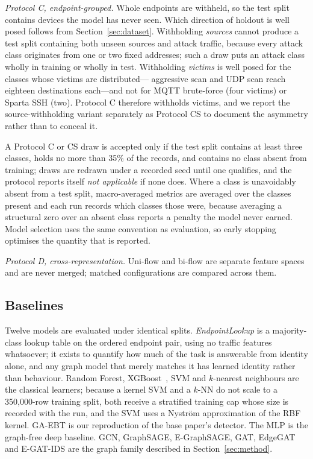 \emph{Protocol C, endpoint-grouped.} Whole endpoints are withheld, so the test
split contains devices the model has never seen. Which direction of holdout is
well posed follows from Section~\ref{sec:dataset}. Withholding \emph{sources}
cannot produce a test split containing both unseen sources and attack traffic,
because every attack class originates from one or two fixed addresses; such a
draw puts an attack class wholly in training or wholly in test. Withholding
\emph{victims} is well posed for the classes whose victims are distributed---
aggressive scan and UDP scan reach eighteen destinations each---and not for
MQTT brute-force (four victims) or Sparta SSH (two). Protocol C therefore
withholds victims, and we report the source-withholding variant separately as
Protocol CS to document the asymmetry rather than to conceal it.

A Protocol C or CS draw is accepted only if the test split contains at least
three classes, holds no more than 35\% of the records, and contains no class
absent from training; draws are redrawn under a recorded seed until one
qualifies, and the protocol reports itself \emph{not applicable} if none does.
Where a class is unavoidably absent from a test split, macro-averaged metrics
are averaged over the classes present and each run records which classes those
were, because averaging a structural zero over an absent class reports a
penalty the model never earned. Model selection uses the same convention as
evaluation, so early stopping optimises the quantity that is reported.

\emph{Protocol D, cross-representation.} Uni-flow and bi-flow are separate
feature spaces and are never merged; matched configurations are compared across
them.

\subsection{Baselines}

Twelve models are evaluated under identical splits.
\emph{EndpointLookup} is a majority-class lookup table on the ordered endpoint
pair, using no traffic features whatsoever; it exists to quantify how much of
the task is answerable from identity alone, and any graph model that merely
matches it has learned identity rather than behaviour. Random Forest,
XGBoost~\cite{chen2016xgboost}, SVM and $k$-nearest neighbours are the
classical learners; because a kernel SVM and a $k$-NN do not scale to a
350{,}000-row training split, both receive a stratified training cap whose size
is recorded with the run, and the SVM uses a Nystr\"om approximation of the RBF
kernel. GA-EBT is our reproduction of the base paper's detector. The MLP is
the graph-free deep baseline. GCN, GraphSAGE, E-GraphSAGE, GAT, EdgeGAT and
E-GAT-IDS are the graph family described in Section~\ref{sec:method}.

